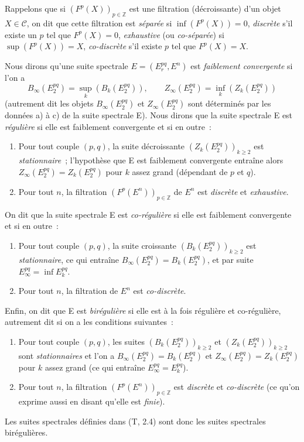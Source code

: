 \begin{env}[11.1.3]
\label{0.11.1.3-fr}
Rappelons que si $(F^p(X))_{p\in\mathbb Z}$ est une filtration (décroissante)
d'un objet $X\in\mathcal C$, on dit que cette filtration est \emph{séparée}
si $\inf(F^p(X))=0$, \emph{discrète} s'il existe un $p$ tel que $F^p(X)=0$,
\emph{exhaustive} (ou \emph{co-séparée}) si $\sup(F^p(X))=X$,
\emph{co-discrète} s'il existe $p$ tel que $F^p(X)=X$.

Nous dirons qu'une suite spectrale $E=(E_r^{pq},E^n)$ est \emph{faiblement
convergente} si l'on a
\[
  B_\infty(E_2^{pq})=\sup_k(B_k(E_2^{pq})),\qquad
  Z_\infty(E_2^{pq})=\inf_k(Z_k(E_2^{pq}))
\]
(autrement dit les objets $B_\infty(E_2^{pq})$ et $Z_\infty(E_2^{pq})$
sont déterminés par les données a) à c) de la suite spectrale E). Nous dirons
que la suite spectrale E est \emph{régulière} si elle est faiblement
convergente et si en outre~:
\begin{enumerate}
  \item[$1^\circ$] Pour tout couple $(p,q)$, la suite décroissante
    $(Z_k(E_2^{pq}))_{k\geq2}$ est \emph{stationnaire}~; l'hypothèse que E
    est faiblement convergente entraîne alors
    $Z_\infty(E_2^{pq})=Z_k(E_2^{pq})$ pour $k$ assez grand (dépendant de
    $p$ et $q$).
  \item[$2^\circ$] Pour tout $n$, la filtration
    $(F^p(E^n))_{p\in\mathbb Z}$ de $E^n$ est \emph{discrète} et
    \emph{exhaustive}.
\end{enumerate}

On dit que la suite spectrale E est \emph{co-régulière} si elle est
faiblement convergente et si en outre~:
\begin{enumerate}
  \item[$3^\circ$] Pour tout couple $(p,q)$, la suite croissante
    $(B_k(E_2^{pq}))_{k\geq2}$ est \emph{stationnaire}, ce qui entraîne
    $B_\infty(E_2^{pq})=B_k(E_2^{pq})$, et par suite
    $E_\infty^{pq}=\inf E_k^{pq}$.
  \item[$4^\circ$] Pour tout $n$, la filtration de $E^n$ est
    \emph{co-discrète}.
\end{enumerate}

Enfin, on dit que E est \emph{birégulière} si elle est à la fois régulière
et co-régulière, autrement dit si on a les conditions suivantes~:
\begin{enumerate}
  \item[(a)] Pour tout couple $(p,q)$, les suites
    $(B_k(E_2^{pq}))_{k\geq2}$ et $(Z_k(E_2^{pq}))_{k\geq2}$ sont
    \emph{stationnaires} et l'on a
    $B_\infty(E_2^{pq})=B_k(E_2^{pq})$ et
    $Z_\infty(E_2^{pq})=Z_k(E_2^{pq})$ pour $k$ assez grand (ce qui entraîne
    $E_\infty^{pq}=E_k^{pq}$).
  \item[(b)] Pour tout $n$, la filtration $(F^p(E^n))_{p\in\mathbb Z}$ est
    \emph{discrète} et \emph{co-discrète} (ce qu'on exprime aussi en disant
    qu'elle est \emph{finie}).
\end{enumerate}

Les suites spectrales définies dans (T, 2.4) sont donc les suites spectrales
birégulières.
\end{env}

